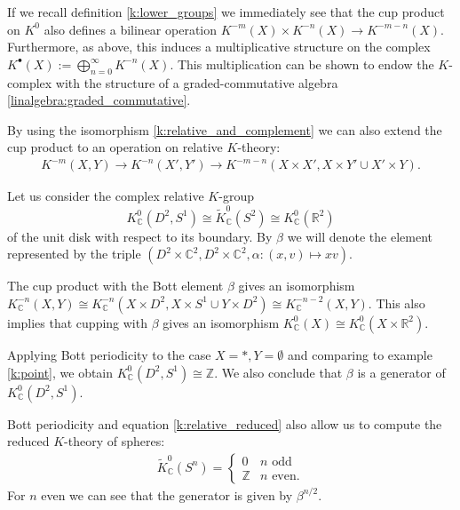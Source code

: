 {    \begin{property}
        If we recall definition \ref{k:lower_groups} we immediately see that the cup product on $K^0$ also defines a bilinear operation $K^{-m}(X)\times K^{-n}(X)\rightarrow K^{-m-n}(X)$. Furthermore, as above, this induces a multiplicative structure on the complex $K^\bullet(X):=\bigoplus_{n=0}^\infty K^{-n}(X)$. This multiplication can be shown to endow the $K$-complex with the structure of a graded-commutative algebra \ref{linalgebra:graded_commutative}.

        By using the isomorphism \ref{k:relative_and_complement} we can also extend the cup product to an operation on relative $K$-theory:
        \begin{gather}
            K^{-m}(X, Y)\rightarrow K^{-n}(X', Y')\rightarrow K^{-m-n}(X\times X', X\times Y'\cup X'\times Y).
        \end{gather}
    \end{property}

    \begin{notation}
        Let us consider the complex relative $K$-group \[K^0_{\mathbb{C}}(D^2, S^1)\cong\widetilde{K}^0_{\mathbb{C}}(S^2)\cong K^0_{\mathbb{C}}(\mathbb{R}^2)\] of the unit disk with respect to its boundary. By $\beta$ we will denote the element represented by the triple $\left(D^2\times\mathbb{C}^2, D^2\times\mathbb{C}^2, \alpha:(x,v)\mapsto xv\right)$.
    \end{notation}
    \begin{theorem}
        The cup product with the Bott element $\beta$ gives an isomorphism $K^{-n}_{\mathbb{C}}(X, Y)\cong K^{-n}_{\mathbb{C}}(X\times D^2, X\times S^1\cup Y\times D^2)\cong K^{-n-2}_{\mathbb{C}}(X, Y)$. This also implies that cupping with $\beta$ gives an isomorphism $K^0_{\mathbb{C}}(X)\cong K^0_{\mathbb{C}}(X\times\mathbb{R}^2)$.
    \end{theorem}
    \begin{result}
        Applying Bott periodicity to the case $X=\ast, Y=\emptyset$ and comparing to example \ref{k:point}, we obtain $K^0_{\mathbb{C}}(D^2, S^1)\cong\mathbb{Z}$. We also conclude that $\beta$ is a generator of $K^0_{\mathbb{C}}(D^2, S^1)$.
    \end{result}
    \begin{result}[Spheres]
        Bott periodicity and equation \ref{k:relative_reduced} also allow us to compute the reduced $K$-theory of spheres:
        \begin{gather}
            \widetilde{K}^0_{\mathbb{C}}(S^n) =
            \begin{cases}
                0&n\text{ odd}\\
                \mathbb{Z}&n\text{ even}.
            \end{cases}
        \end{gather}
        For $n$ even we can see that the generator is given by $\beta^{n/2}$.
    \end{result}

}
